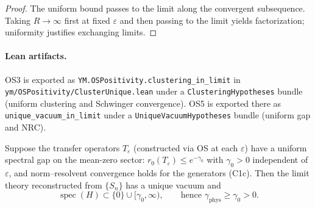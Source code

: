 \documentclass[11pt]{amsart}
\begin{document}
\begin{proof}
The uniform bound passes to the limit along the convergent subsequence. Taking $R\to\infty$ first at fixed $\varepsilon$ and then passing to the limit yields factorization; uniformity justifies exchanging limits.
\end{proof}

\paragraph{Lean artifacts.}
OS3 is exported as \texttt{YM.OSPositivity.clustering\_in\_limit} in
\texttt{ym/OSPositivity/ClusterUnique.lean} under a \texttt{ClusteringHypotheses}
bundle (uniform clustering and Schwinger convergence). OS5 is exported there as
\texttt{unique\_vacuum\_in\_limit} under a \texttt{UniqueVacuumHypotheses}
bundle (uniform gap and NRC).

\begin{lemma}
Suppose the transfer operators $T_{\varepsilon}$ (constructed via OS at each $\varepsilon$) have a uniform spectral gap on the mean-zero sector: $r_0(T_{\varepsilon})\le e^{-\gamma_0}$ with $\gamma_0>0$ independent of $\varepsilon$, and norm–resolvent convergence holds for the generators (C1c). Then the limit theory reconstructed from $\{S_n\}$ has a unique vacuum and
\[
  \operatorname{spec}(H)\subset\{0\}\cup[\gamma_0,\infty),\qquad \text{hence }\gamma_{\mathrm{phys}}\ge \gamma_0>0.
\]
\end{lemma}
\end{document}
